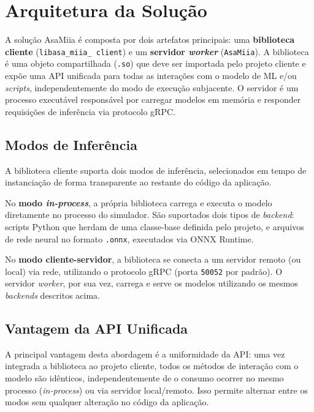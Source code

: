 \newpage

\section{Arquitetura da Solução}

A solução AsaMiia é composta por dois artefatos principais: uma \textbf{biblioteca cliente} (\texttt{libasa\_miia\_ client}) e um \textbf{servidor \textit{worker}} (\texttt{AsaMiia}). A biblioteca é uma objeto compartilhada (\texttt{.so}) que deve ser importada pelo projeto cliente e expõe uma API unificada para todas as interações com o modelo de ML e/ou \textit{scripts}, independentemente do modo de execução subjacente. O servidor é um processo executável responsável por carregar modelos em memória e responder requisições de inferência via protocolo gRPC.

\subsection{Modos de Inferência}

A biblioteca cliente suporta dois modos de inferência, selecionados em tempo de instanciação de forma transparente ao restante do código da aplicação.

No \textbf{modo \textit{in-process}}, a própria biblioteca carrega e executa o modelo diretamente no processo do simulador. São suportados dois tipos de \textit{backend}: scripts Python que herdam de uma classe-base definida pelo projeto, e arquivos de rede neural no formato \texttt{.onnx}, executados via ONNX Runtime.

No \textbf{modo cliente-servidor}, a biblioteca se conecta a um servidor remoto (ou local) via rede, utilizando o protocolo gRPC (porta \texttt{50052} por padrão). O servidor \textit{worker}, por sua vez, carrega e serve os modelos utilizando os mesmos \textit{backends} descritos acima.

\subsection{Vantagem da API Unificada}

A principal vantagem desta abordagem é a uniformidade da API: uma vez integrada a biblioteca ao projeto cliente, todos os métodos de interação com o modelo são idênticos, independentemente de o consumo ocorrer no mesmo processo (\textit{in-process}) ou via servidor local/remoto. Isso permite alternar entre os modos sem qualquer alteração no código da aplicação.

